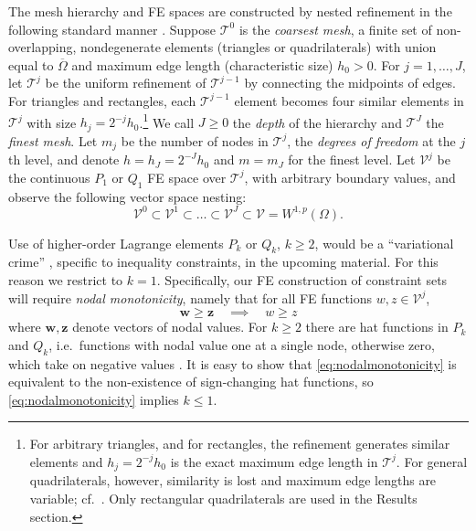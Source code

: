 \documentclass[letterpaper,final,12pt,reqno]{amsart}
\theoremstyle{cstyle}
\theoremstyle{cstyle*}
\theoremstyle{dstyle}
\numberwithin{equation}{section}
\numberwithin{figure}{section}
\numberwithin{table}{section}
\numberwithin{theorem}{section}
\newcommand{\bw}{\mathbf{w}}
\newcommand{\bz}{\mathbf{z}}
\begin{document}
The mesh hierarchy and FE spaces are constructed by nested refinement in the following standard manner \cite{Elmanetal2014}.  Suppose $\mathcal{T}^0$ is the \emph{coarsest mesh}, a finite set of non-overlapping, nondegenerate elements (triangles or quadrilaterals) with union equal to $\overline{\Omega}$ and maximum edge length (characteristic size) $h_0>0$.  For $j=1,\dots,J$, let $\mathcal{T}^j$ be the uniform refinement of $\mathcal{T}^{j-1}$ by connecting the midpoints of edges.  For triangles and rectangles, each $\mathcal{T}^{j-1}$ element becomes four similar elements in $\mathcal{T}^j$ with size $h_j = 2^{-j} h_0$.\footnote{For arbitrary triangles, and for rectangles, the refinement generates similar elements and $h_j=2^{-j}h_0$ is the exact maximum edge length in $\mathcal{T}^j$.  For general quadrilaterals, however, similarity is lost and maximum edge lengths are variable; cf.~\cite{Zhang2004}.  Only rectangular quadrilaterals are used in the Results section.}  We call $J\ge 0$ the \emph{depth} of the hierarchy and $\mathcal{T}^J$ the \emph{finest mesh}.  Let $m_j$ be the number of nodes in $\mathcal{T}^j$, the \emph{degrees of freedom} at the $j$th level, and denote $h=h_J=2^{-J} h_0$ and $m=m_J$ for the finest level.  Let $\mathcal{V}^j$ be the continuous $P_1$ or $Q_1$ FE space \cite{Elmanetal2014} over $\mathcal{T}^j$, with arbitrary boundary values, and observe the following vector space nesting:
\begin{equation}
\mathcal{V}^0 \subset \mathcal{V}^1 \subset \dots \subset \mathcal{V}^J \subset \mathcal{V}=W^{1,p}(\Omega).  \label{eq:fe:nestedspaces}
\end{equation}

Use of higher-order Lagrange elements $P_k$ or $Q_k$, $k\ge 2$, would be a ``variational crime'' \cite[Chapter 10]{BrennerScott2007}, specific to inequality constraints, in the upcoming material.  For this reason we restrict to $k = 1$.  Specifically, our FE construction of constraint sets will require \emph{nodal monotonicity}, namely that for all FE functions $w,z \in \mathcal{V}^j$,
\begin{equation}
\bw \ge \bz \quad \implies \quad w \ge z \label{eq:nodalmonotonicity}
\end{equation}
where $\bw,\bz$ denote vectors of nodal values.  For $k\ge 2$ there are hat functions in $P_k$ and $Q_k$, i.e.~functions with nodal value one at a single node, otherwise zero, which take on negative values \cite[Figure 1.7]{Elmanetal2014}.  It is easy to show that \eqref{eq:nodalmonotonicity} is equivalent to the non-existence of sign-changing hat functions, so \eqref{eq:nodalmonotonicity} implies $k\le 1$.
\end{document}
